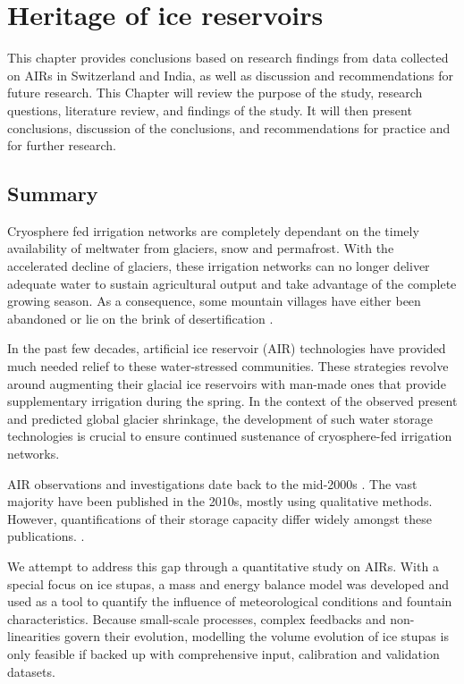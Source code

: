 \chapter{Heritage of ice reservoirs}

This chapter provides conclusions based on research findings from data collected on AIRs in Switzerland and India,
as well as discussion and recommendations for future research. This Chapter will review the purpose of the
study, research questions, literature review, and findings of the study. It will then present conclusions,
discussion of the conclusions, and recommendations for practice and for further research.

\section{Summary}

Cryosphere fed irrigation networks are completely dependant on the timely availability of meltwater from
glaciers, snow and permafrost. With the accelerated decline of glaciers, these irrigation networks can no longer
deliver adequate water to sustain agricultural output and take advantage of the complete growing season. As a
consequence, some mountain villages have either been abandoned or lie on the brink of desertification
\cite{grossmanHimalayanGlaciersMelt2015}.

In the past few decades, artificial ice reservoir (AIR) technologies have provided much needed relief to these
water-stressed communities. These strategies revolve around augmenting their glacial ice reservoirs with
man-made ones that provide supplementary irrigation during the spring. In the context of the observed present
and predicted global glacier shrinkage, the development of such water storage technologies is crucial to ensure
continued sustenance of cryosphere-fed irrigation networks.

AIR observations and investigations date back to the mid-2000s \cite{tveitenGlacierGrowingLocal2007}. The vast
majority have been published in the 2010s, mostly using qualitative methods. However, quantifications of their
storage capacity differ widely amongst these publications. \citep{baglaArtificialGlaciersHelp1998,
  norphelSnowWaterHarvesting2015, nusserSociohydrologyArtificialGlaciers2019}.

We attempt to address this gap through a quantitative study on AIRs. With a special focus on ice stupas, a mass
and energy balance model was developed and used as a tool to quantify the influence of meteorological conditions
and fountain characteristics. Because small-scale processes, complex feedbacks and non-linearities govern their
evolution, modelling the volume evolution of ice stupas is only feasible if backed up with comprehensive input,
calibration and validation datasets.

